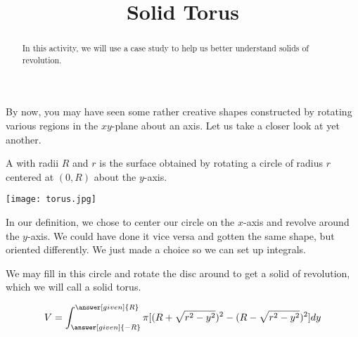 \documentclass{ximera}
\title{Solid Torus}
\begin{document}
\begin{abstract}
In this activity, we will use a case study to help us better understand solids of revolution.
\end{abstract}
\maketitle

By now, you may have seen some rather creative shapes constructed by rotating various regions in the $xy$-plane about an axis. Let us take a closer look at yet another.
\begin{definition}
	A  with radii $R$ and $r$ is the surface obtained by rotating a circle of radius $r$ centered at $(0,R)$ about the $y$-axis.
\end{definition}

\begin{image}
	\label{torus}
	\texttt{[image: torus.jpg]}
\end{image}

\begin{remark}
	In our definition, we chose to center our circle on the $x$-axis and revolve around the $y$-axis. We could have done it vice versa and gotten the same shape, but oriented differently. We just made a choice so we can set up integrals.
\end{remark} 

We may fill in this circle and rotate the disc around to get a solid of revolution, which we will call a solid torus.

	
	\begin{exercise}
		\begin{align*}
			V  &= \int_{\answer[given]{-R}}^{\answer[given]{R}} \pi [ (R+\sqrt{r^2-y^2})^{2}-(R-\sqrt{r^2-y^2})^{2}] dy \\
		\end{align*}
	\end{exercise}
\end{document}
